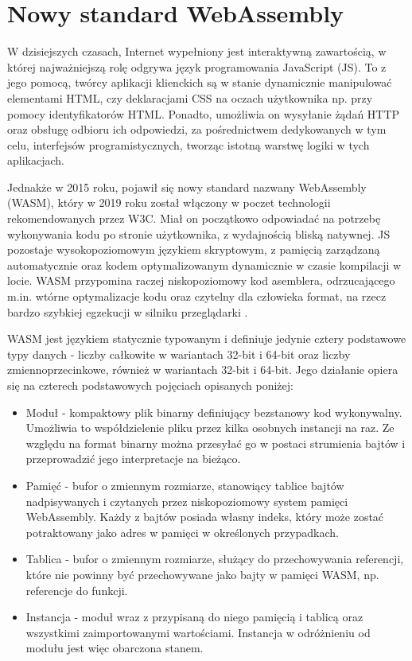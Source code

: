 \section{Nowy standard WebAssembly}

W dzisiejszych czasach, Internet wypełniony jest interaktywną zawartością, w której najważniejszą rolę odgrywa język programowania JavaScript (JS). To z jego pomocą, twórcy aplikacji klienckich są w stanie dynamicznie manipulować elementami HTML, czy deklaracjami CSS na oczach użytkownika np. przy pomocy identyfikatorów HTML. Ponadto, umożliwia on wysyłanie żądań HTTP oraz obsługę odbioru ich odpowiedzi, za pośrednictwem dedykowanych w tym celu, interfejsów programistycznych, tworząc istotną warstwę logiki w tych aplikacjach.

Jednakże w 2015 roku, pojawił się nowy standard nazwany WebAssembly (WASM), który w 2019 roku został włączony w poczet technologii rekomendowanych przez W3C. Miał on początkowo odpowiadać na potrzebę wykonywania kodu po stronie użytkownika, z wydajnością bliską natywnej. JS pozostaje wysokopoziomowym językiem skryptowym, z pamięcią zarządzaną automatycznie oraz kodem optymalizowanym dynamicznie w czasie kompilacji w locie. WASM przypomina raczej niskopoziomowy kod asemblera, odrzucającego m.in. wtórne optymalizacje kodu oraz czytelny dla człowieka format, na rzecz bardzo szybkiej egzekucji w silniku przeglądarki \cite{wasm.concepts}.

WASM jest językiem statycznie typowanym i definiuje jedynie cztery podstawowe typy danych - liczby całkowite w wariantach 32-bit i 64-bit oraz liczby zmiennoprzecinkowe, również w wariantach 32-bit i 64-bit. Jego działanie opiera się na czterech podstawowych pojęciach opisanych poniżej:

\begin{itemize}
    \item Moduł - kompaktowy plik binarny definiujący bezstanowy kod wykonywalny. Umożliwia to współdzielenie pliku przez kilka osobnych instancji na raz. Ze względu na format binarny można przesyłać go w postaci strumienia bajtów i przeprowadzić jego interpretacje na bieżąco.
    \item Pamięć - bufor o zmiennym rozmiarze, stanowiący tablice bajtów nadpisywanych i czytanych przez niskopoziomowy system pamięci WebAssembly. Każdy z bajtów posiada własny indeks, który może zostać potraktowany jako adres w pamięci w określonych przypadkach.
    \item Tablica - bufor o zmiennym rozmiarze, służący do przechowywania referencji, które nie powinny być przechowywane jako bajty w pamięci WASM, np. referencje do funkcji.
    \item Instancja - moduł wraz z przypisaną do niego pamięcią i tablicą oraz wszystkimi zaimportowanymi wartościami. Instancja w odróżnieniu od modułu jest więc obarczona stanem.
\end{itemize}

